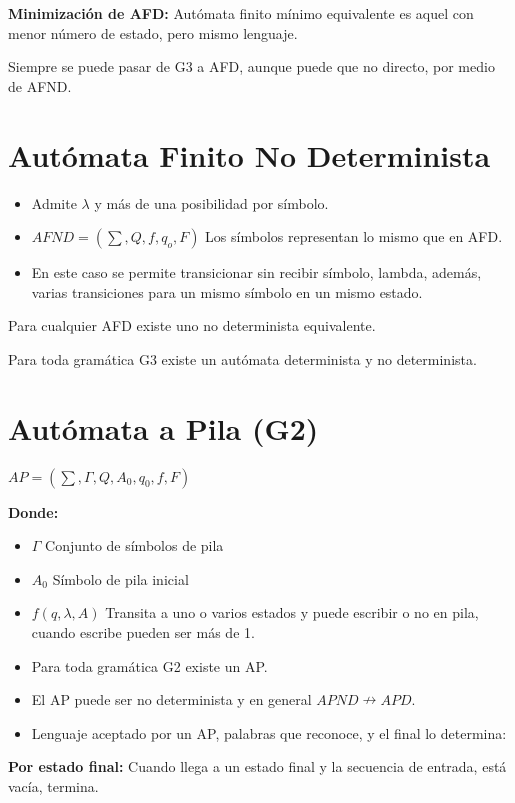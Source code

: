 \documentclass[12pt, twoside, openright]{report} %
\begin{document}
\textbf{Minimización de AFD:} Autómata finito mínimo equivalente es
aquel con menor número de estado, pero mismo lenguaje.

Siempre se puede pasar de G3 a AFD, aunque puede que no directo, por
medio de AFND.


\section{Autómata Finito No Determinista}

\begin{itemize}
\item
  Admite \(\lambda\) y más de una posibilidad por símbolo.
\item
  \(AFND=( \sum, Q, f, q_o, F)\) Los símbolos representan lo mismo que
  en AFD.
\item
  En este caso se permite transicionar sin recibir símbolo, lambda,
  además, varias transiciones para un mismo símbolo en un mismo estado.
\end{itemize}

Para cualquier AFD existe uno no determinista equivalente.

Para toda gramática G3 existe un autómata determinista y no
determinista.


\section{Autómata a Pila (G2)}

\(AP=(\sum, \Gamma, Q, A_0, q_0, f, F)\)

\textbf{Donde:}

\begin{itemize}
\item
  \(\Gamma\) Conjunto de símbolos de pila
\item
  \(A_0\) Símbolo de pila inicial
\item
  \(f(q,\lambda,A)\) Transita a uno o varios estados y puede escribir o
  no en pila, cuando escribe pueden ser más de 1.
\item
  Para toda gramática G2 existe un AP.
\item
  El AP puede ser no determinista y en general
  \(APND \nrightarrow APD\).
\item
  Lenguaje aceptado por un AP, palabras que reconoce, y el final lo
  determina:
\end{itemize}

\textbf{Por estado final:} Cuando llega a un estado final y la secuencia
de entrada, está vacía, termina.
\end{document}
